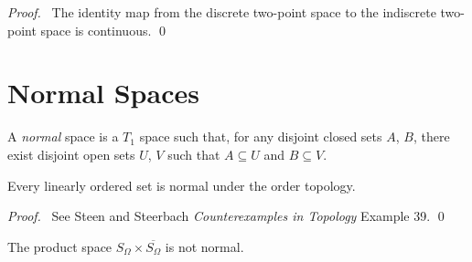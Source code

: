 \begin{proof}
 \pf\ The identity map from the discrete two-point space to the indiscrete two-point space is continuous. \qed
\end{proof}

\section{Normal Spaces}

  \begin{df}
  A \emph{normal} space is a $T_1$ space such that, for any disjoint closed
sets $A$, $B$, there exist disjoint open sets $U$, $V$ such that $A \subseteq
U$ and $B \subseteq V$.
\end{df}

  \begin{thm}
 Every linearly ordered set is normal under the order topology.
\end{thm}

\begin{proof}
  \pf\ See Steen and Steerbach \emph{Counterexamples in Topology} Example 39.
\qed
\end{proof}

  \begin{prop}
    \label{prop:topology:normal:S_Omega_times_S_Omega}
  The product space $S_\Omega \times \overline{S_\Omega}$ is not normal.
\end{prop}


